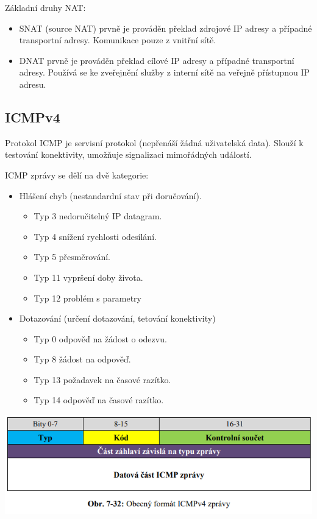 Základní druhy NAT:
\begin{itemize}
    \item SNAT (source NAT) prvně je prováděn překlad zdrojové IP adresy a případné transportní adresy. Komunikace pouze z vnitřní sítě.
    \item DNAT prvně je prováděn překlad cílové IP adresy a případné transportní adresy. Používá se ke zveřejnění služby z interní sítě na veřejně přístupnou IP adresu.
\end{itemize}

\subsection{ICMPv4}

Protokol ICMP je servisní protokol (nepřenáší žádná uživatelská data). Slouží k testování konektivity, umožňuje signalizaci mimořádných událostí. 

ICMP zprávy se dělí na dvě kategorie:
\begin{itemize}[noitemsep]
    \item Hlášení chyb (nestandardní stav při doručování).
    \begin{itemize}[noitemsep]
        \item Typ 3 nedoručitelný IP datagram.
        \item Typ 4 snížení rychlosti odesílání.
        \item Typ 5 přesměrování.
        \item Typ 11 vypršení doby života.
        \item Typ 12 problém s parametry
    \end{itemize}
    \item Dotazování (určení dotazování, tetování konektivity)
    \begin{itemize}[noitemsep]
        \item Typ 0 odpověď na žádost o odezvu.
        \item Typ 8 žádost na odpověď.
        \item Typ 13 požadavek na časové razítko.
        \item Typ 14 odpověď na časové razítko.
    \end{itemize}
\end{itemize}

\begin{center}
	\includegraphics[scale=0.5]{images/-044.png}
\end{center}

